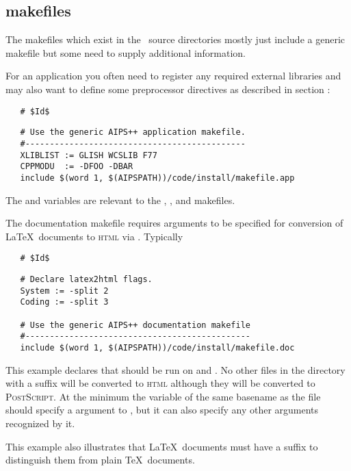 \subsection*{makefiles}

The makefiles which exist in the \aipspp\ source directories mostly just
include a generic makefile but some need to supply additional information.

For an application you often need to register any required external libraries
and may also want to define some preprocessor directives as described in
section :

\noindent
\verb+   # $+\verb+Id$+

\begin{verbatim}
   # Use the generic AIPS++ application makefile.
   #---------------------------------------------
   XLIBLIST := GLISH WCSLIB F77
   CPPMODU  := -DFOO -DBAR
   include $(word 1, $(AIPSPATH))/code/install/makefile.app
\end{verbatim}

\noindent
The  and  variables are relevant to the
, , and  makefiles.

The documentation makefile requires arguments to be specified for conversion
of \LaTeX\ documents to \textsc{html} via .  Typically

\noindent
\verb+   # $+\verb+Id$+

\begin{verbatim}
   # Declare latex2html flags.
   System := -split 2
   Coding := -split 3

   # Use the generic AIPS++ documentation makefile
   #----------------------------------------------
   include $(word 1, $(AIPSPATH))/code/install/makefile.doc
\end{verbatim}

\noindent
This example declares that  should be run on
 and .  No other files in the directory
with a  suffix will be converted to \textsc{html} although they
will be converted to \textsc{PostScript}.  At the minimum the variable of
the same basename as the  file should specify a 
argument to , but it can also specify any other arguments
recognized by it.

This example also illustrates that \LaTeX\ documents must have a 
suffix to distinguish them from plain \TeX\ documents.

